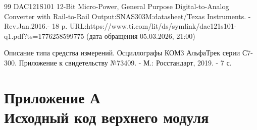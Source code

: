 \documentclass[12pt,a4paper,TimesNewRoman]{article}
\begin{document}
\begin{thebibliography}{99}
    DAC121S101 12-Bit Micro-Power, General Purpose Digital-to-Analog Converter with Rail-to-Rail Output:SNAS303M:datasheet/Texas Instruments. - Rev.Jan.2016.- 18 p. URL:https://www.ti.com/lit/ds/symlink/dac121s101-q1.pdf?ts=1776258599775 (дата обращения 05.03.2026, 21:00)

    Описание типа средства измерений. Осциллографы КОМ3 АльфаТрек серии С7-300. Приложение к свидетельству №73409. - М.: Росстандарт, 2019. - 7 с.
\end{thebibliography}

\newpage
\section*{Приложение А \\ Исходный код верхнего модуля}
\end{document}
